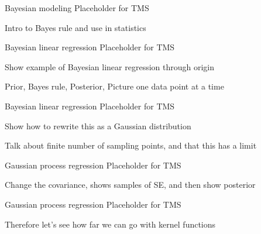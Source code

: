 \begin{frame}{Bayesian modeling}
  Placeholder for TMS
  
  Intro to Bayes rule and use in statistics
\end{frame}

\begin{frame}{Bayesian linear regression}
  Placeholder for TMS
  
  Show example of Bayesian linear regression through origin
  
  Prior, Bayes rule, Posterior, Picture one data point at a time
\end{frame}

\begin{frame}{Bayesian linear regression}
  Placeholder for TMS
  
  Show how to rewrite this as a Gaussian distribution
  
  Talk about finite number of sampling points, and that this has a limit
\end{frame}

\begin{frame}{Gaussian process regression}
  Placeholder for TMS
  
  Change the covariance, shows samples of SE, and then show posterior
\end{frame}


\begin{frame}{Gaussian process regression}
  Placeholder for TMS
  
  Therefore let's see how far we can go with kernel functions
\end{frame}

